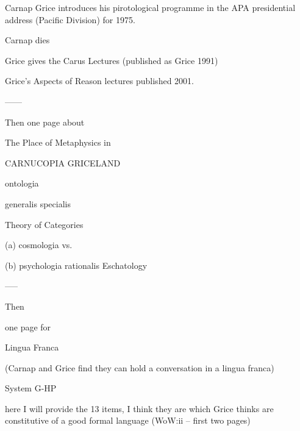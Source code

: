 \documentclass[10pt,titlepage]{book}
\begin{document}
{ 
   Carnap       
                                     Grice introduces his pirotological
                                      programme in the APA presidential
                                      address (Pacific Division) for 1975.
 
 
      Carnap dies
 
                                     Grice gives the Carus Lectures
                                           (published as Grice 1991)
 
                                    Grice's Aspects of Reason lectures
                                            published 2001.
 
 
 
------
 
 
Then one page about 
 
                The Place of Metaphysics in
 
 
CARNUCOPIA                                   GRICELAND
 
 
                                                       ontologia
 
 
                                       generalis                           
specialis
 
                                    Theory of Categories
 
                                                                            
   (a) cosmologia
                                             vs.
 
                                                                            
   (b) psychologia rationalis
                                     Eschatology
 
                    
         
 
-----
 
Then
 
                             one page for
 
 
 
                               Lingua Franca
 
               (Carnap and Grice find they can hold
               a conversation in a lingua franca)
 
                         System G-HP
 
                    here I will provide 
                   the 13 items, I think they are
                 which Grice thinks are constitutive
                    of a good formal language
                    (WoW:ii -- first two pages)
 
}
\end{document}
